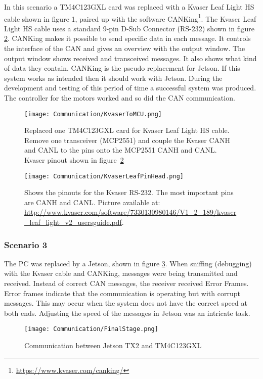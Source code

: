 In this scenario a TM4C123GXL card was replaced with a Kvaser Leaf Light HS cable shown in figure \ref{fig:KvaserToMCU}, paired up with the software CANKing\footnote{\url{https://www.kvaser.com/canking/}}. The Kvaser Leaf Light HS cable uses a standard 9-pin D-Sub Connector (RS-232) shown in figure \ref{fig:KvaserLeafPinHead}. CANKing makes it possible to send specific data in each message. It controls the interface of the CAN and gives an overview with the output window. The output window shows received and transceived messages. It also shows what kind of data they contain. CANKing is the pseudo replacement for Jetson. If this system works as intended then it should work with Jetson.\newline
\indent During the development and testing of this period of time a successful system was produced. The controller for the motors worked and so did the CAN communication.
\begin{figure}[!ht]
\centering
\texttt{[image: Communication/KvaserToMCU.png]}
\caption{Replaced one TM4C123GXL card for Kvaser Leaf Light HS cable. Remove one transceiver (MCP2551) and couple the Kvaser CANH and CANL to the pins onto the MCP2551 CANH and CANL. Kvaser pinout shown in figure~\ref{fig:KvaserLeafPinHead}}
\label{fig:KvaserToMCU}
\end{figure}
\begin{figure}[!ht]
\centering
\texttt{[image: Communication/KvaserLeafPinHead.png]}
\caption{Shows the pinouts for the Kvaser RS-232. The most important pins are CANH and CANL. Picture available at: \url{http://www.kvaser.com/software/7330130980146/V1_2_189/kvaser_leaf_light_v2_usersguide.pdf}.}
\label{fig:KvaserLeafPinHead}
\end{figure}
\subsubsection{Scenario 3} 
The PC was replaced by a Jetson, shown in figure \ref{fig:FinalStage}. \newline 
When sniffing (debugging) with the Kvaser cable and CANKing, messages were being transmitted and received. Instead of correct CAN messages, the receiver received Error Frames. Error frames indicate that the communication is operating but with corrupt messages. This may occur when the system does not have the correct speed at both ends. Adjusting the speed of the messages in Jetson was an intricate task.  \newline
\begin{figure}[!ht]
\centering
\texttt{[image: Communication/FinalStage.png]}
\caption{Communication between Jetson TX2 and TM4C123GXL}
\label{fig:FinalStage}
\end{figure}

